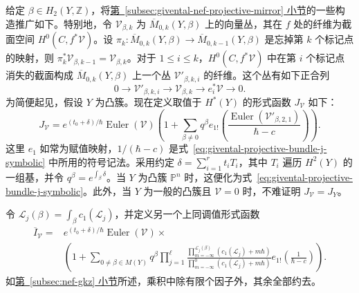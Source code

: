 给定 $\beta\in H_2(Y,\mathbb Z)$，将\hyperref[subsec:givental-nef-projective-mirror]{第~\ref*{subsec:givental-nef-projective-mirror} 小节}的一些构造推广如下。特别地，令 $\mathcal V_{\beta,k}$ 为 $\overline M_{0,k}(Y,\beta)$ 上的向量丛，其在 $f$ 处的纤维为截面空间 $H^0(C,f^*\mathcal V)$。设 $\pi_k:\overline M_{0,k}(Y,\beta)\to\overline M_{0,k-1}(Y,\beta)$ 是忘掉第 $k$ 个标记点的映射，则 $\pi_k^*\mathcal V_{\beta,k-1}=\mathcal V_{\beta,k}$。对于 $1\le i\le k$，$H^0(C,f^*\mathcal V)$ 中在第 $i$ 个标记点消失的截面构成 $\overline M_{0,k}(Y,\beta)$ 上一个丛 $\mathcal V'_{\beta,k,i}$ 的纤维。这个丛有如下正合列
\[
0\longrightarrow\mathcal V'_{\beta,k,i}\longrightarrow\mathcal V_{\beta,k}\longrightarrow e_i^*\mathcal V\longrightarrow0.
\]
为简便起见，假设 $Y$ 为凸簇。现在定义取值于 $H^*(Y)$ 的形式函数 $J_{\mathcal V}$ 如下：
\begin{equation}\label{eq:givental-general-j-function}
J_{\mathcal V}=e^{(t_0+\delta)/\hbar}\operatorname{Euler}(\mathcal V)
\left(1+\sum_{\beta\ne0}q^\beta e_{1!}\left(\frac{\operatorname{Euler}(\mathcal V'_{\beta,2,1})}{\hbar-c}\right)\right).
\end{equation}
这里 $e_1$ 如常为赋值映射，$1/(\hbar-c)$ 是式~\eqref{eq:givental-projective-bundle-j-symbolic} 中所用的符号记法。采用约定 $\delta=\sum_{i=1}^r t_iT_i$，其中 $T_i$ 遍历 $H^2(Y)$ 的一组基，并令 $q^\beta=e^{\int_\beta\delta}$。当 $Y$ 为凸簇 $\mathbb P^n$ 时，这便化为式~\eqref{eq:givental-projective-bundle-j-symbolic}。此外，当 $Y$ 为一般的凸簇且 $\mathcal V=0$ 时，不难证明 $J_{\mathcal V}=J_Y$。

令 $\mathcal L_j(\beta)=\int_\beta c_1(\mathcal L_j)$，并定义另一个上同调值形式函数
\[
\begin{aligned}
\overline I_{\mathcal V}={}&e^{(t_0+\delta)/\hbar}\operatorname{Euler}(\mathcal V)\times\\
&\left(1+\sum_{0\ne\beta\in M(Y)}q^\beta
\prod_{j=1}^{\ell}\frac{\prod_{m=-\infty}^{\mathcal L_j(\beta)}(c_1(\mathcal L_j)+m\hbar)}{\prod_{m=-\infty}^0(c_1(\mathcal L_j)+m\hbar)}
 e_{1!}\left(\frac1{\hbar-c}\right)\right).
\end{aligned}
\]
如\hyperref[subsec:nef-gkz]{第~\ref*{subsec:nef-gkz} 小节}所述，乘积中除有限个因子外，其余全部约去。

